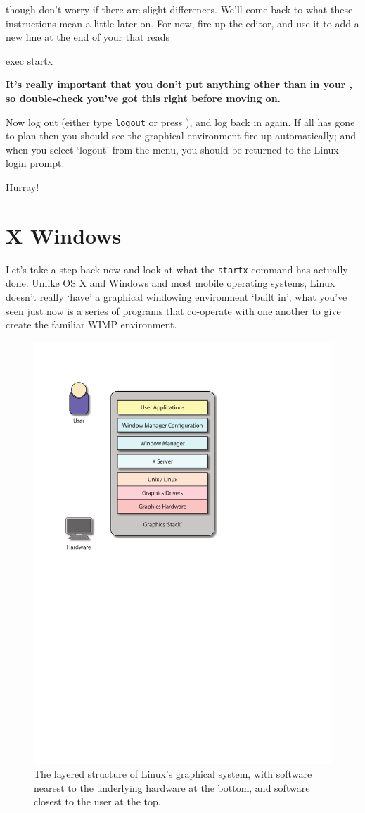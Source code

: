 though don't worry if there are slight differences. We'll come back to what these instructions mean a little later on. For now, fire up the  editor, and use it to add a new line at the end of your  that reads 

\begin{ttoutenv}
exec startx
\end{ttoutenv}

\textbf{It's really important that you don't put anything other than  in your , so double-check you've got this right before moving on.}

Now log out (either type \texttt{logout} or press ), and log back in again. If all has gone to plan then you should see the graphical environment fire up automatically; and when you select `logout' from the menu, you should be returned to the Linux login prompt. 

Hurray!

\section{X Windows}

Let's take a step back now and look at what the \texttt{startx} command has actually done. Unlike OS X and Windows and most mobile operating systems, Linux doesn't really `have' a graphical windowing environment `built in'; what you've seen just now is a series of programs that co-operate with one another to give create the familiar WIMP environment. 

\begin{figure}[htb]
  \begin{center}
    \includegraphics[width=.5\textwidth]{images/graphics-stack.pdf}
  \end{center}
\caption{The layered structure of Linux's graphical system, with software nearest to the underlying hardware at the bottom, and software closest to the user at the top.}
\label{figure:Xstructure}
\end{figure}

